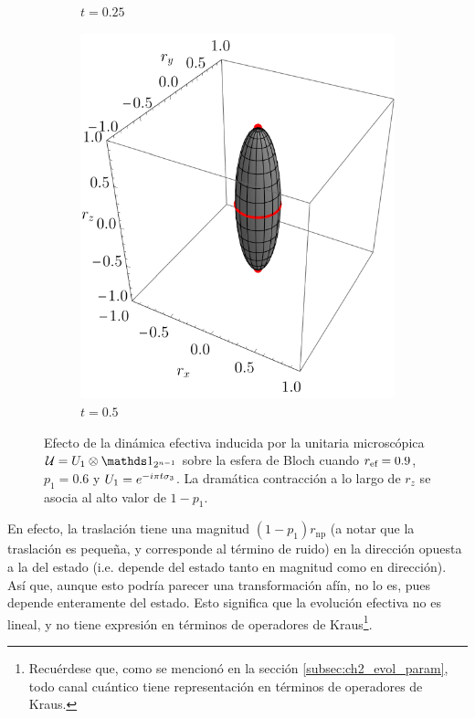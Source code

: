 \begin{figure}[ht!]
\begin{subfigure}{0.32\textwidth}
      \caption{$t=0.25$}
    \end{subfigure}
    \begin{subfigure}{0.32\textwidth}
      \centering
      \includegraphics[width=0.9\linewidth]{chapter4/figures_separable/szxId_t=0.5_p=0.6_r=0.9.pdf}
      \caption{$t=0.5$}
    \end{subfigure}
    \caption{Efecto de la dinámica efectiva inducida por la unitaria microscópica $\mcU=U_{1}\otimes\Id_{2^{n-1}}$ sobre la esfera de Bloch cuando $r_{\text{ef}}=0.9$, $p_{1}=0.6$ y $U_{1}=e^{-i\pi t \sigma_{3}}$. La dramática contracción a lo largo de $r_{z}$ se asocia al alto valor de $1-p_{1}$. \label{fig:FaseChangeSequence}}
\end{figure}

En efecto, la traslación tiene una magnitud $(1-p_{1})r_{\text{np}}$ (a notar que la traslación es pequeña, y corresponde al término de ruido) en la dirección opuesta a la del estado (i.e. depende del estado tanto en magnitud como en dirección). Así que, aunque esto podría parecer una transformación afín, no lo es, pues depende enteramente del estado. Esto significa que la evolución efectiva no es lineal, y no tiene expresión en términos de operadores de Kraus\footnote{Recuérdese que, como se mencionó en la sección \ref{subsec:ch2_evol_param}, todo canal cuántico tiene representación en términos de operadores de Kraus.}.

